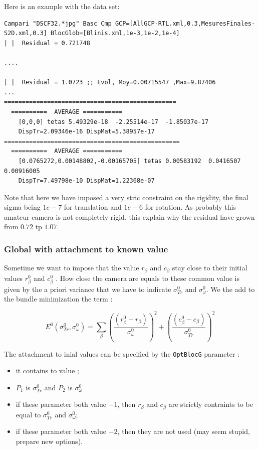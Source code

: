Here is an example with the data set:

\begin{verbatim}
Campari "DSCF32.*jpg" Basc Cmp GCP=[AllGCP-RTL.xml,0.3,MesuresFinales-S2D.xml,0.3] BlocGlob=[Blinis.xml,1e-3,1e-2,1e-4]
| |  Residual = 0.721748

....

| |  Residual = 1.0723 ;; Evol, Moy=0.00715547 ,Max=9.87406
...
================================================
  ==========  AVERAGE =========== 
    [0,0,0] tetas 5.49329e-18  -2.25514e-17  -1.85037e-17
    DispTr=2.09346e-16 DispMat=5.38957e-17
=================================================
  ==========  AVERAGE =========== 
    [0.0765272,0.00148802,-0.00165705] tetas 0.00583192  0.0416507  0.00916005
    DispTr=7.49798e-10 DispMat=1.22368e-07
\end{verbatim}

Note that here we have imposed a very stric constraint on the rigidity, the final sigma being
$1e-7$ for translation and $1e-6$ for rotation. As probably this amateur camera is not completely
rigid, this explain why the residual have grown from $0.72$ tp $1.07$.


\subsubsection{Global with attachment to known value }

Sometime we want to impose that the value $r_\beta$ and $c_\beta$ stay close
to their initial values  $r^0_\beta$ and $c^0_\beta$ .
How close the camera are equals to these common value is given by the a priori
variance that we have to indicate  $\sigma^0_{Tr} $ and $\sigma^0_{\omega} $.
We the add to the bundle minimization the term :

\begin{equation}
      E^0(\sigma^0_{Tr},\sigma^0_{\omega}) =
      \sum _{\beta}
      (\frac{(r^0_\beta-r_\beta)}{\sigma^0_{\omega}}) ^2
       +(\frac{(c^0_\beta-c_\beta)}{\sigma^0 _{Tr}})^2
\end{equation}

The attachment to inial values can be specified by the {\tt OptBlocG} parameter :

\begin{itemize}
    \item  it contains to value ;
    \item  $P_1$ is $\sigma^0 _{Tr}$ and $P_2$ is $\sigma^0 _{\omega}$
    \item  if these parameter both value $-1$, then  $r_\beta$ and $c_\beta$ are
           strictly contraints to be equal to $\sigma^0_{Tr} $ and $\sigma^0_{\omega} $;
    \item  if these parameter both value $-2$,  then they are not used (may seem stupid, prepare new options).
\end{itemize}

